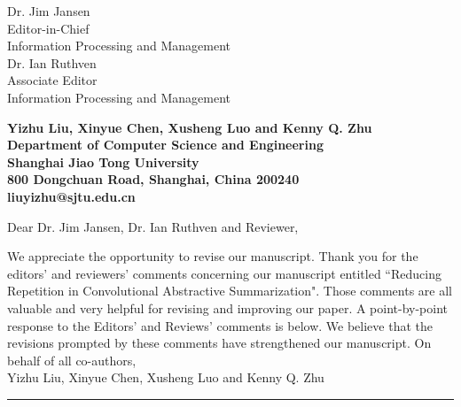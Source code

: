 \documentclass[11pt]{letter} %
\begin{document}
	
	
	\begin{letter}{Dr. Jim Jansen \\
			Editor-in-Chief  \\
			Information Processing and Management\\
			Dr. Ian Ruthven \\
			Associate Editor \\
			Information Processing and Management} 
		
        \begin{center}
        \large\bf Yizhu Liu, Xinyue Chen, Xusheng Luo and Kenny Q. Zhu \\ %
        Department of Computer Science and Engineering \\ Shanghai Jiao Tong University \\ 800 Dongchuan Road, Shanghai, China 200240 \\
        liuyizhu@sjtu.edu.cn
        \end{center} 
        \vfill

        \signature{Yizhu Liu, Xinyue Chen, Xusheng Luo and Kenny Q. Zhu} %
		
		
		\opening{Dear Dr. Jim Jansen, Dr. Ian Ruthven and Reviewer,} 
		
		We appreciate the opportunity to revise our manuscript. 
		Thank you for the editors' and reviewers' comments concerning our 
		manuscript entitled ``Reducing Repetition in Convolutional Abstractive Summarization". 
		Those comments are all valuable and very helpful
		for revising and improving our paper.
		A point-by-point response to the Editors' and Reviews' comments is below. 
		We believe that the revisions prompted by these comments have strengthened our manuscript.
		\newline\newline
		On behalf of all co-authors,\\
		Yizhu Liu, Xinyue Chen, Xusheng Luo and Kenny Q. Zhu
		\newline\hrule


\end{letter}
\end{document}
